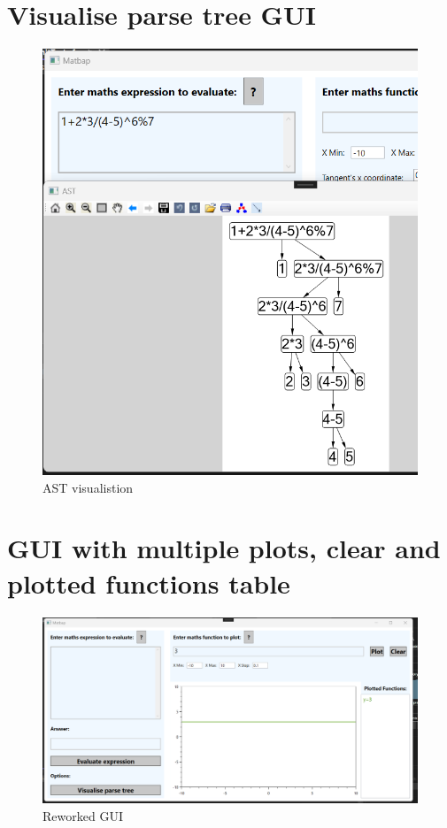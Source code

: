 \documentclass[a4paper, oneside, 11pt]{report}
\begin{document}
\section{Visualise parse tree GUI}
\begin{figure}[H]
\begin{center}
\includegraphics[scale=0.3 ]{VisualuseASTGUI.png}
\caption{AST visualistion}
\label{basicgui}
\end{center}
\end{figure}

\section{GUI with multiple plots, clear and plotted functions table}
\begin{figure}[H]
\begin{center}
\includegraphics[scale=0.3 ]{MultiplePlotsGUI.png}
\caption{Reworked GUI}
\label{basicgui}
\end{center}
\end{figure}
\end{document}
